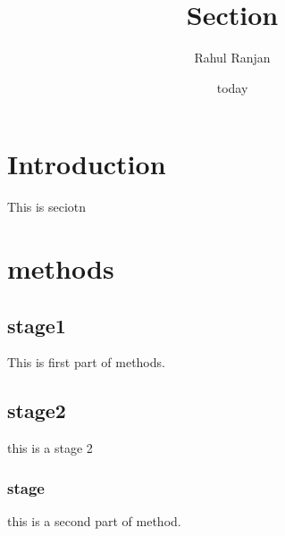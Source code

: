 \documentclass{article}
\title{Section}
\author{Rahul Ranjan}
\date{today}
\begin{document}
\maketitle


    \section{Introduction}

    This is  seciotn

    \section{methods}

    \subsection{stage1}
    This is first part of methods.

    \subsection{stage2}
	this is a stage 2
    \subsubsection{stage}
    this is a second part of method.
\end{document}
